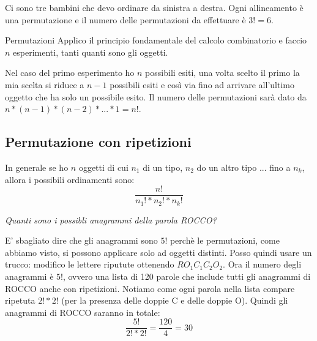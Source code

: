 \begin{Example}{}{}
    Ci sono tre bambini che devo ordinare da sinistra a destra. Ogni allineamento è una permutazione e il numero delle permutazioni da effettuare è $3!=6$.   
\end{Example}

\begin{Demonstration}{Permutazioni}{}
    Applico il principio fondamentale del calcolo combinatorio e faccio $n$ esperimenti, tanti quanti sono gli oggetti.

    Nel caso del primo esperimento ho $n$ possibili esiti, una volta scelto il primo la mia scelta si riduce a $n-1$ possibili esiti e così via fino ad arrivare all'ultimo oggetto che ha solo un possibile esito. Il numero delle permutazioni sarà dato da $n*(n-1)*(n-2)*...*1=n!$.
\end{Demonstration}

\subsection*{Permutazione con ripetizioni}
In generale se ho $n$ oggetti di cui $n_1$ di un tipo, $n_2$ do un altro tipo ... fino a $n_k$, allora i possibili ordinamenti sono:
\begin{equation*}
    \frac{n!}{n_1!*n_2!*n_k!}
\end{equation*}

\begin{Example}{}{}
    \textit{Quanti sono i possibli anagrammi della parola ROCCO?}

    E' sbagliato dire che gli anagrammi sono $5!$ perchè le permutazioni, come abbiamo visto, si possono applicare solo ad oggetti distinti. Posso quindi usare un trucco: modifico le lettere riputute ottenendo $RO_1C_1C_2O_2$.
    Ora il numero degli anagrammi è $5!$, ovvero una lista di 120 parole che include tutti gli anagrammi di ROCCO anche con ripetizioni.
    Notiamo come ogni parola nella lista compare ripetuta $2!*2!$ (per la presenza delle doppie C e delle doppie O).
    Quindi gli anagrammi di ROCCO saranno in totale:
    \begin{equation*}
        \frac{5!}{2!*2!}=\frac{120}{4}=30
    \end{equation*}
\end{Example}

